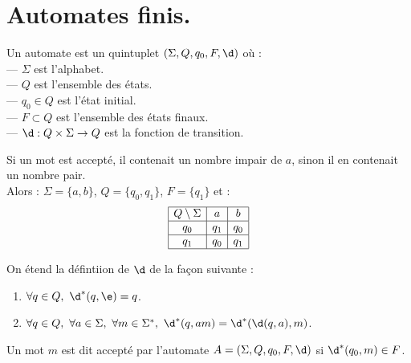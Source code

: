 \documentclass[french, 11pt]{article}
\renewcommand*{\S}{\Sigma}
\begin{document}
\section{Automates finis.}

\begin{defi}{}{}
    Un automate est un quintuplet $(\S,Q,q_0,F,\d)$ où :\\
    --- $\S$ est l'alphabet.\\
    --- $Q$ est l'ensemble des états.\\
    --- $q_0\in Q$ est l'état initial.\\
    --- $F\subset Q$ est l'ensemble des états finaux.\\
    --- $\d:Q\times\S\to Q$ est la fonction de transition.
\end{defi}

\begin{ex}{}{}
    \begin{center}
    \end{center}
    Si un mot est accepté, il contenait un nombre impair de $a$, sinon il en contenait un nombre pair.\\
    Alors : $\S=\{a,b\}$, $Q=\{q_0,q_1\}$, $F=\{q_1\}$ et :
    \begin{eqnarray*}
        \begin{array}{|c|c|c|}
            \hline
            Q\setminus \S& a & b\\
            \hline
            q_0 & q_1 & q_0\\
            \hline
            q_1 & q_0 & q_1\\
            \hline
        \end{array}
    \end{eqnarray*}
\end{ex}

\begin{defi}{}{}
    On étend la défintiion de $\d$ de la façon suivante :
    \begin{enumerate}
        \item $\forall q \in Q, ~ \d^*(q,\e)=q$.
        \item $\forall q \in Q, ~ \forall a \in \S, ~ \forall m \in \S^*, ~ \d^*(q,am)=\d^*(\d(q,a),m)$.
    \end{enumerate}
    Un mot $m$ est dit accepté par l'automate $A=(\S,Q,q_0,F,\d)$ si $\d^*(q_0,m)\in F$.
\end{defi}
\end{document}
